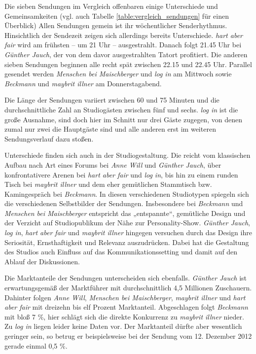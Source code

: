 Die sieben Sendungen im Vergleich offenbaren einige Unterschiede und Gemeinsamkeiten (vgl. auch Tabelle \vref{table:vergleich_sendungen} für einen Überblick) Allen Sendungen gemein ist ihr wöchentlicher Senderhythmus. Hinsichtlich der Sendezeit zeigen sich allerdings bereits Unterschiede. \textit{hart aber fair} wird am frühsten – um 21 Uhr – ausgestrahlt. Danach folgt 21.45 Uhr bei \textit{Günther Jauch}, der von dem davor ausgestrahlten Tatort profitiert. Die anderen sieben Sendungen beginnen alle recht spät zwischen 22.15 und 22.45 Uhr. Parallel gesendet werden \textit{Menschen bei Maischberger} und \textit{log in} am Mittwoch sowie \textit{Beckmann} und \textit{maybrit illner} am Donnerstagabend.

Die Länge der Sendungen variiert zwischen 60 und 75 Minuten und die durchschnittliche Zahl an Studiogästen zwischen fünf und sechs. \textit{log in} ist die große Ausnahme, sind doch hier im Schnitt nur drei Gäste zugegen, von denen zumal nur zwei die Hauptgäste sind und alle anderen erst im weiteren Sendungsverlauf dazu stoßen.

Unterschiede finden sich auch in der Studiogestaltung. Die reicht vom klassischen Aufbau nach Art eines Forums bei \textit{Anne Will} und \textit{Günther Jauch}, über konfrontativere Arenen bei \textit{hart aber fair} und \textit{log in}, bis hin zu einem runden Tisch bei \textit{maybrit illner} und dem eher gemütlichen Stammtisch bzw. Kamingespräch bei \textit{Beckmann}. In diesen verschiedenen Studiotypen spiegeln sich die verschiedenen Selbstbilder der Sendungen. Insbesondere bei \textit{Beckmann} und \textit{Menschen bei Maischberger} entspricht das „entspannte“, gemütliche Design und der Verzicht auf Studiopublikum der Nähe zur Personality-Show. \textit{Günther Jauch}, \textit{log in}, \textit{hart aber fair} und \textit{maybrit illner} hingegen versuchen durch das Design ihre Seriosität, Ernsthaftigkeit und Relevanz auszudrücken. Dabei hat die Gestaltung des Studios auch Einfluss auf das Kommunikationssetting und damit auf den Ablauf der Diskussionen.

Die Marktanteile der Sendungen unterscheiden sich ebenfalls. \textit{Günther Jauch} ist erwartungsgemäß der Marktführer mit durchschnittlich 4,5 Millionen Zuschauern. Dahinter folgen \textit{Anne Will}, \textit{Menschen bei Maischberger}, \textit{maybrit illner} und \textit{hart aber fair} mit dreizehn bis elf Prozent Marktanteil. Abgeschlagen folgt \textit{Beckmann} mit bloß 7 \%, hier schlägt sich die direkte Konkurrenz zu \textit{maybrit illner} nieder. Zu \textit{log in} liegen leider keine Daten vor. Der Marktanteil dürfte aber wesentlich geringer sein, so betrug er beispielsweise bei der Sendung vom 12. Dezember 2012 gerade einmal 0,5 \%.

